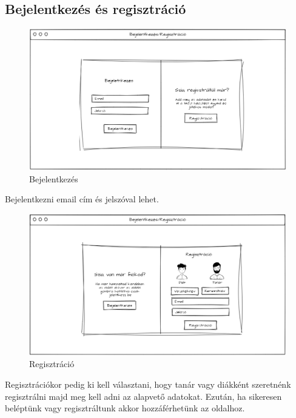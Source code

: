 \subsection{Bejelentkezés és regisztráció}

\begin{figure}[H]
    \centering
    \includegraphics[width=\linewidth]{images/login_wireframe.png}
    \caption{Bejelentkezés}
    \label{fig:login_wireframe}
\end{figure}

Bejelentkezni  email cím és jelszóval lehet.

\begin{figure}[H]
    \centering
    \includegraphics[width=\linewidth]{images/signin_wireframe.png}
    \caption{Regisztráció}
    \label{fig:signin_wireframe}
\end{figure}

Regisztrációkor  pedig ki kell választani, hogy tanár vagy diákként szeretnénk regisztrálni majd meg kell adni az alapvető adatokat.
Ezután, ha sikeresen beléptünk vagy regisztráltunk akkor hozzáférhetünk az oldalhoz.

